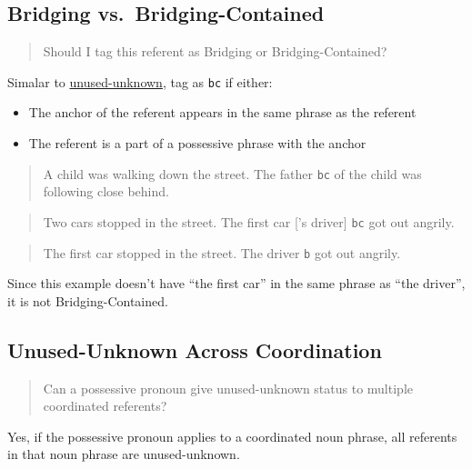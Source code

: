 \documentclass[
]{book}
\providecommand{\tightlist}{%
  \setlength{\itemsep}{0pt}\setlength{\parskip}{0pt}}
\begin{document}
\hypertarget{bridging-vs.-bridging-contained}{%
\subsection{Bridging vs.~Bridging-Contained}\label{bridging-vs.-bridging-contained}}

\begin{quote}
Should I tag this referent as Bridging or Bridging-Contained?
\end{quote}

Simalar to \protect\hyperlink{new-vs.-unused-unknown}{unused-unknown}, tag as \texttt{bc} if either:

\begin{itemize}
\tightlist
\item
  The anchor of the referent appears in the same phrase as the referent
\item
  The referent is a part of a possessive phrase with the anchor
\end{itemize}

\begin{quote}
A child was walking down the street.
The father \texttt{bc} of the child was following close behind.
\end{quote}

\begin{quote}
Two cars stopped in the street.
The first car {[}'s driver{]} \texttt{bc} got out angrily.
\end{quote}

\begin{quote}
The first car stopped in the street.
The driver \texttt{b} got out angrily.
\end{quote}

Since this example doesn't have ``the first car'' in the same phrase as ``the driver'', it is not Bridging-Contained.

\hypertarget{unused-unknown-across-coordination}{%
\subsection{Unused-Unknown Across Coordination}\label{unused-unknown-across-coordination}}

\begin{quote}
Can a possessive pronoun give unused-unknown status to multiple coordinated referents?
\end{quote}

Yes, if the possessive pronoun applies to a coordinated noun phrase, all referents in that noun phrase are unused-unknown.
\end{document}
